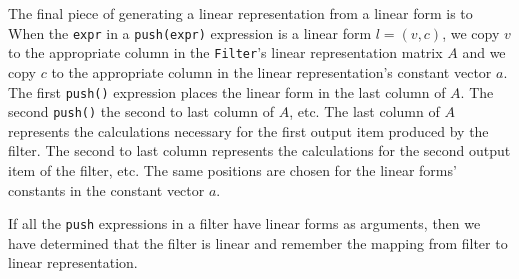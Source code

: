 The final piece of generating a linear representation from a linear form is to 
When the {\tt expr} in a {\tt push(expr)} expression is a linear form $l=(v,c)$, 
we copy $v$ to the appropriate column in the {\tt Filter}'s linear representation matrix $A$ 
and we copy $c$ to the appropriate column in the linear representation's constant vector $a$.
The first {\tt push()} expression places the linear form in the last column of $A$. The second
{\tt push()} the second to last column of $A$, etc. The last column of $A$ represents 
the calculations necessary for the first output item produced by the filter. The second to last
column represents the calculations for the second output item of the filter, etc.
The same positions are chosen for the linear forms' constants in the constant vector $a$.

If all the {\tt push} expressions in a filter have linear forms as arguments, 
then we have determined that the filter is linear and remember the mapping from 
filter to linear representation.
